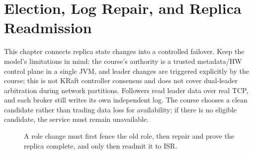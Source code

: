 \chapter{Election, Log Repair, and Replica Readmission}
This chapter connects replica state changes into a controlled failover. Keep the model's limitations in mind: the course's authority is a trusted metadata/HW control plane in a single JVM, and leader changes are triggered explicitly by the course; this is not KRaft controller consensus and does not cover dual-leader arbitration during network partitions. Followers read leader data over real TCP, and each broker still writes its own independent log. The course chooses a clean candidate rather than trading data loss for availability; if there is no eligible candidate, the service must remain unavailable.

\begin{figure}[ht]
\centering
{}
\caption{A role change must first fence the old role, then repair and prove the replica complete, and only then readmit it to ISR.}
\end{figure}

